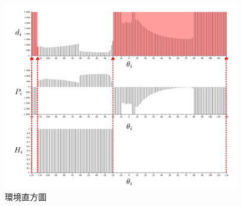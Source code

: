 \begin{figure}
	\centering
	\includegraphics[width=0.92\textwidth]{figures/algorithm/closest_histograms}
	\caption{環境直方圖}
	\label{f:closest_histograms}
\end{figure}

